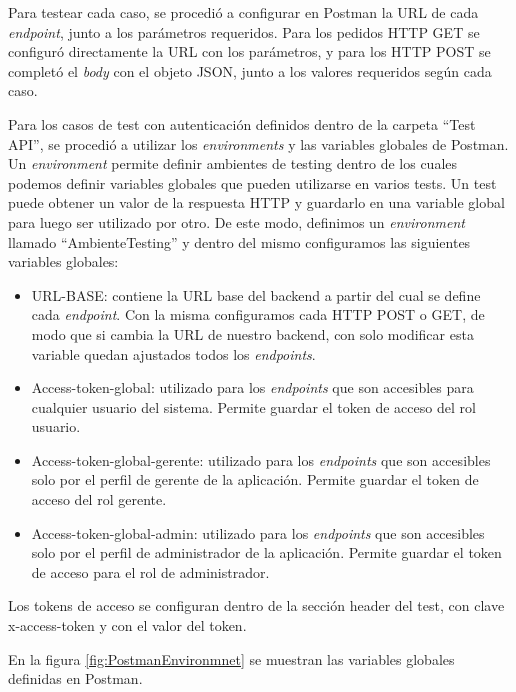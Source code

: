 Para testear cada caso, se procedió a configurar en Postman la URL de cada \textit{endpoint}, junto a los parámetros requeridos. Para los pedidos HTTP GET se configuró directamente la URL con los parámetros, y para los HTTP POST se completó el \textit{body} con el objeto JSON, junto a los valores requeridos según cada caso. 

\pagebreak
Para los casos de test con autenticación definidos dentro de la carpeta ``Test API'', se procedió a utilizar los \textit{environments} y las variables globales de Postman. Un \textit{environment} permite definir ambientes de testing dentro de los cuales podemos definir variables globales que pueden utilizarse en varios tests. Un test puede obtener un valor de la respuesta HTTP y guardarlo en una variable global para luego ser utilizado por otro. De este modo, definimos un \textit{environment} llamado ``AmbienteTesting'' y dentro del mismo configuramos las siguientes variables globales:

\begin{itemize}
\item URL-BASE: contiene la URL base del backend a partir del cual se define cada \textit{endpoint}. Con la misma configuramos cada HTTP POST o GET, de modo que si cambia la URL de nuestro backend, con solo modificar esta variable quedan ajustados todos los \textit{endpoints}.

\item Access-token-global: utilizado para los \textit{endpoints} que son accesibles para cualquier usuario del sistema. Permite guardar el token de acceso del rol usuario.

\item Access-token-global-gerente: utilizado para los \textit{endpoints} que son accesibles solo por el perfil de gerente de la aplicación. Permite guardar el token de acceso del rol gerente.

\item Access-token-global-admin: utilizado para los \textit{endpoints} que son accesibles solo por el perfil de administrador de la aplicación. Permite guardar el token de acceso para el rol de administrador.
\end{itemize}

Los tokens de acceso se configuran dentro de la sección header del test, con clave x-access-token y con el valor del token.

En la figura \ref{fig:PostmanEnvironmnet} se muestran las variables globales definidas en Postman.

